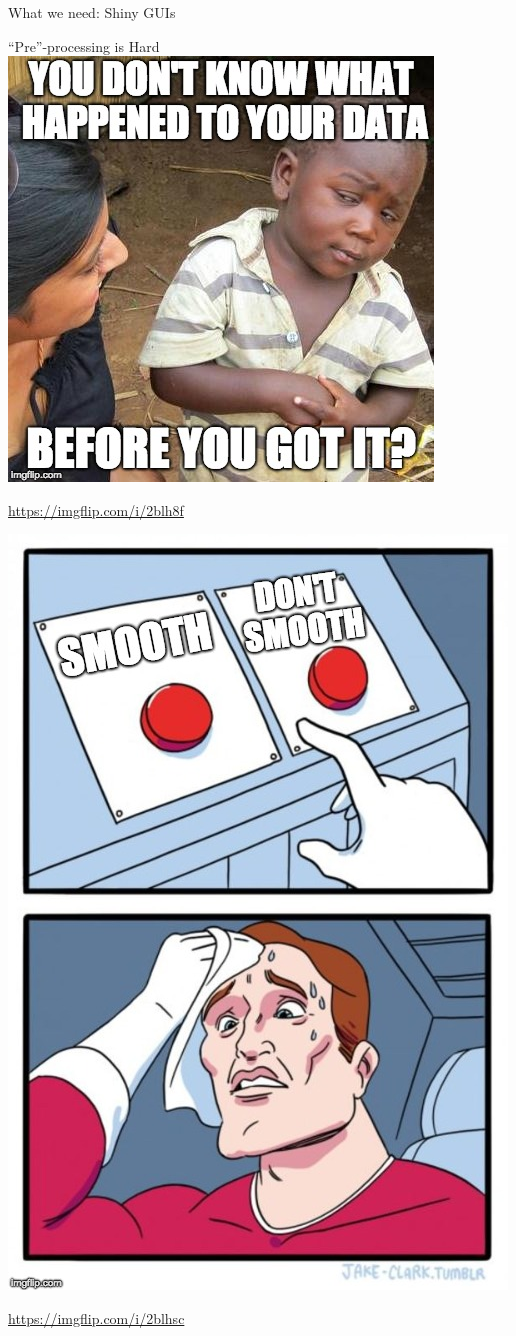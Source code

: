 \documentclass[ignorenonframetext,]{beamer}
\begin{document}
\begin{frame}{What we need: Shiny GUIs}
\begin{block}{“Pre”-processing is Hard}
\includegraphics[width=1\linewidth]{figure/know_processing}

\url{https://imgflip.com/i/2blh8f}

\includegraphics[width=0.75\linewidth]{figure/choose_smoothing}

\url{https://imgflip.com/i/2blhsc}

\end{block}

\end{frame}
\end{document}

